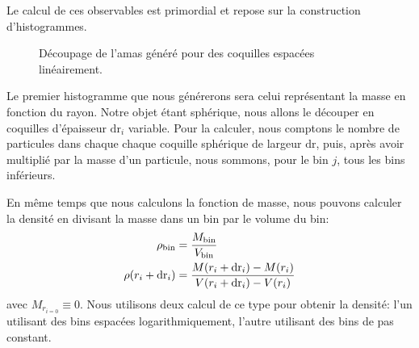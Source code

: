 			Le calcul de ces observables est primordial et repose sur la construction d'histogrammes.
			\begin{wrapfigure}{l}{0.40\textwidth}
				\begin{center}
				\end{center}
				\caption{Découpage de l'amas généré pour des coquilles espacées linéairement.\label{schema::bin}}
			\end{wrapfigure}
			Le premier histogramme que nous générerons sera celui représentant la masse en fonction du rayon. Notre objet étant sphérique,
			nous allons le découper en coquilles d'épaisseur $\mathrm{dr}_i$ variable.
			Pour la calculer, nous comptons le nombre de particules dans chaque chaque coquille sphérique de largeur $\mathrm{dr}$, puis,
			après avoir multiplié par la masse d'un particule, nous sommons, pour le bin $j$, tous les bins inférieurs.

			En même temps que nous calculons la fonction de masse, nous pouvons calculer la densité en divisant la masse dans un bin par
			le volume du bin:
			\begin{align}
				\rho_\mathrm{bin} &= \dfrac{M_\mathrm{bin}}{V_\mathrm{bin}} \notag \\
				\rho(r_i + \mathrm{dr}_i) &= \dfrac{M(r_i + \mathrm{dr}_i) - M(r_i)}{V(r_i + \mathrm{dr}_i) - V(r_i)}
			\end{align}
			avec $M_{r_{i=0}} \equiv 0$.
			Nous utilisons deux calcul de ce type pour obtenir la densité: l'un utilisant des bins espacées logarithmiquement, l'autre
			utilisant des bins de pas constant.

